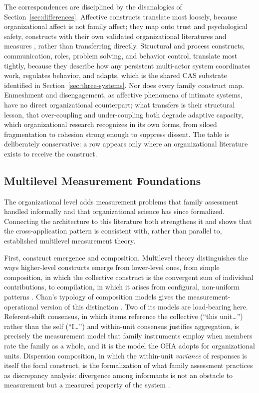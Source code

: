 \documentclass[12pt, letterpaper]{article}
\begin{document}
The correspondences are disciplined by the disanalogies of Section~\ref{sec:differences}. Affective constructs translate most loosely, because organizational affect is not family affect; they map onto trust and psychological safety, constructs with their own validated organizational literatures and measures \parencite{edmondson1999,frazier2017}, rather than transferring directly. Structural and process constructs, communication, roles, problem solving, and behavior control, translate most tightly, because they describe how any persistent multi-actor system coordinates work, regulates behavior, and adapts, which is the shared CAS substrate identified in Section~\ref{sec:three-systems}. Nor does every family construct map. Enmeshment and disengagement, as affective phenomena of intimate systems, have no direct organizational counterpart; what transfers is their structural lesson, that over-coupling and under-coupling both degrade adaptive capacity, which organizational research recognizes in its own forms, from siloed fragmentation to cohesion strong enough to suppress dissent. The table is deliberately conservative: a row appears only where an organizational literature exists to receive the construct.

\subsection{Multilevel Measurement Foundations}
\label{sec:multilevel-foundations}

The organizational level adds measurement problems that family assessment handled informally and that organizational science has since formalized. Connecting the architecture to this literature both strengthens it and shows that the cross-application pattern is consistent with, rather than parallel to, established multilevel measurement theory.

First, construct emergence and composition. Multilevel theory distinguishes the ways higher-level constructs emerge from lower-level ones, from simple composition, in which the collective construct is the convergent sum of individual contributions, to compilation, in which it arises from configural, non-uniform patterns \parencite{kozlowski2000,morgeson1999}. Chan's typology of composition models gives the measurement-operational version of this distinction \parencite{chan1998}. Two of its models are load-bearing here. Referent-shift consensus, in which items reference the collective (``this unit\ldots'') rather than the self (``I\ldots'') and within-unit consensus justifies aggregation, is precisely the measurement model that family instruments employ when members rate the family as a whole, and it is the model the OHA adopts for organizational units. Dispersion composition, in which the within-unit \emph{variance} of responses is itself the focal construct, is the formalization of what family assessment practices as discrepancy analysis: divergence among informants is not an obstacle to measurement but a measured property of the system \parencite{chan1998,delosreyes2005}.
\end{document}
